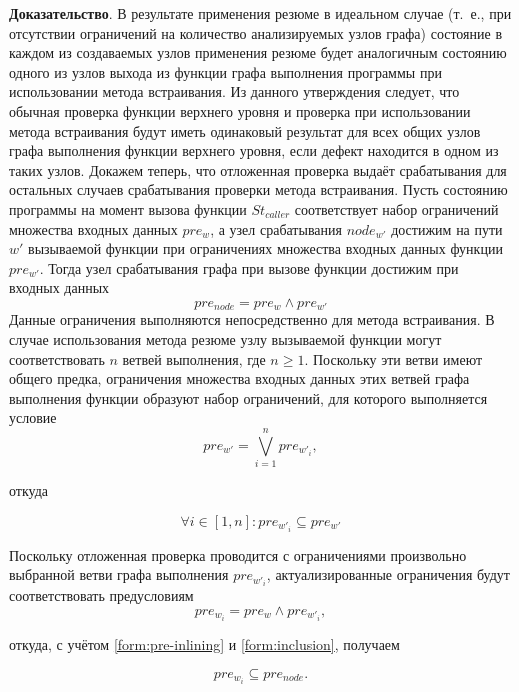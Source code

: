 \textbf{Доказательство}. В результате применения резюме в идеальном случае (т.~е., при отсутствии ограничений на количество анализируемых узлов графа) состояние в каждом из создаваемых узлов применения резюме будет аналогичным состоянию одного из узлов выхода из функции графа выполнения программы при использовании метода встраивания. Из данного утверждения следует, что обычная проверка функции верхнего уровня и проверка при использовании метода встраивания будут иметь одинаковый результат для всех общих узлов графа выполнения функции верхнего уровня, если дефект находится в одном из таких узлов. Докажем теперь, что отложенная проверка выдаёт срабатывания для остальных случаев срабатывания проверки метода встраивания. Пусть состоянию программы на момент вызова функции $St_{caller}$ соответствует набор ограничений множества входных данных $pre_w$, а узел срабатывания $node_{w'}$ достижим на пути $w'$ вызываемой функции при ограничениях множества входных данных функции $pre_{w'}$. Тогда узел срабатывания графа при вызове функции достижим при входных данных 
\begin{equation}
 \label{form:pre-inlining}
 pre_{node} = pre_w \wedge pre_{w'}
\end{equation}
Данные ограничения выполняются непосредственно для метода встраивания. В случае использования метода резюме узлу вызываемой функции могут соответствовать $n$ ветвей выполнения, где $n \geqslant 1$. Поскольку эти ветви имеют общего предка, ограничения множества входных данных этих ветвей графа выполнения функции образуют набор ограничений, для которого выполняется условие 
\begin{equation}
 pre_{w'} = \bigvee_{i = 1}^n pre_{w'_i},
\end{equation}

откуда

\begin{equation}
\label{form:inclusion}
 \forall i \in [1, n]: pre_{w'_i} \subseteq pre_{w'}
\end{equation}

Поскольку отложенная проверка проводится с ограничениями произвольно выбранной ветви графа выполнения $pre_{w'_i}$, актуализированные ограничения будут соответствовать предусловиям 
\begin{equation}
 pre_{w_i} = pre_w \wedge pre_{w'_i},
\end{equation}

откуда, с учётом \ref{form:pre-inlining} и \ref{form:inclusion}, получаем

\begin{equation}
\label{form:total-inclusion}
 pre_{w_i} \subseteq pre_{node}.
\end{equation}

